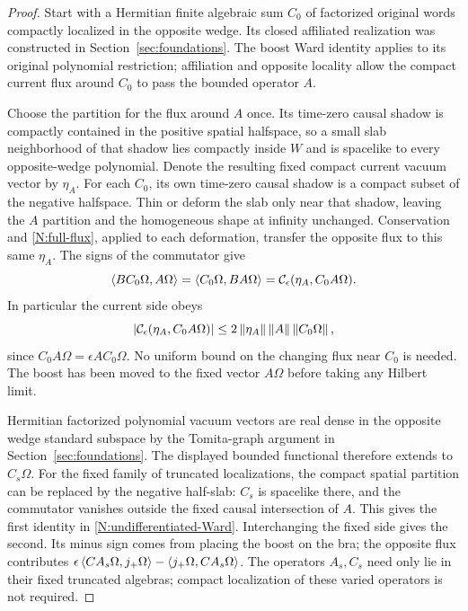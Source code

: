 \begin{proof}
Start with a Hermitian finite algebraic sum $C_0$ of factorized original
words compactly localized in the opposite wedge. Its closed affiliated
realization was constructed in Section~\ref{sec:foundations}. The boost
Ward identity applies to its original polynomial restriction; affiliation
and opposite locality allow the compact current flux around $C_0$ to
pass the bounded operator $A$.

Choose the partition for the flux around $A$ once. Its time-zero causal
shadow is compactly contained in the positive spatial halfspace, so a
small slab neighborhood of that shadow lies compactly inside $W$ and
is spacelike to every opposite-wedge polynomial. Denote the resulting
fixed compact current vacuum vector by $\eta_A$. For each $C_0$, its
own time-zero causal shadow is a compact subset of the negative
halfspace. Thin or deform the slab only near that shadow, leaving the
$A$ partition and the homogeneous shape at infinity unchanged.
Conservation and \eqref{N:full-flux}, applied to each deformation,
transfer the opposite flux to this same $\eta_A$. The signs of the
commutator give
\[
 \left\langle BC_0\Omega,A\Omega\right\rangle
 =\left\langle C_0\Omega,BA\Omega\right\rangle
 =\mathcal C_\epsilon(\eta_A,C_0A\Omega).
\]
In particular the current side obeys
\[
 |\mathcal C_\epsilon(\eta_A,C_0A\Omega)|
 \le2\left\lVert\eta_A\right\rVert\left\lVert A\right\rVert\left\lVert C_0\Omega\right\rVert,
\]
since $C_0A\Omega=\epsilon AC_0\Omega$. No uniform bound on the
changing flux near $C_0$ is needed. The boost has been moved to the
fixed vector $A\Omega$ before taking any Hilbert limit.

Hermitian factorized polynomial vacuum vectors are real dense in the
opposite wedge standard subspace by the Tomita-graph argument in
Section~\ref{sec:foundations}. The displayed bounded functional therefore
extends to $C_s\Omega$. For the fixed family of truncated localizations,
the compact spatial partition can be replaced by the negative half-slab:
$C_s$ is spacelike there, and the commutator vanishes outside the fixed
causal intersection of $A$. This gives the first identity in
\eqref{N:undifferentiated-Ward}. Interchanging the fixed side gives the
second. Its minus sign comes from placing the boost on the bra; the
opposite flux contributes
$\epsilon\left\langle CA_s\Omega,j_+\Omega\right\rangle-\left\langle j_+\Omega,CA_s\Omega\right\rangle$.
The operators $A_s,C_s$ need only lie in their fixed truncated algebras;
compact localization of these varied operators is not required.
\end{proof}

